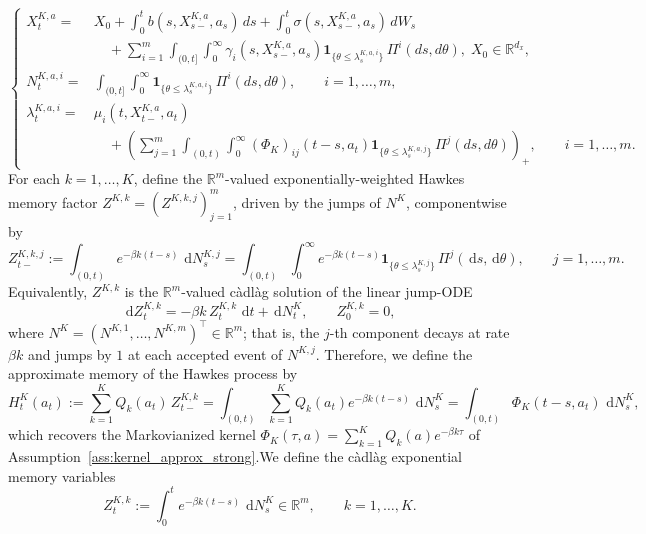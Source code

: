 \documentclass[11pt]{article}
\theoremstyle{remarkitalic}
\theoremstyle{remarkitalic}
\newcommand{\R}{\mathbb R}
\newcommand{\dd}{\,\mathrm d}
\newcommand{\1}{\mathbf 1}
\begin{document}
\begin{equation}
\label{eq:Markov-poisson-embedded-hawkes-sde}
\left\{
\begin{aligned}
X_t^{K,a}
={}&X_0
+\int_0^t b(s,X^{K,a}_{s-},a_s)\,ds
+\int_0^t \sigma(s,X^{K,a}_{s-},a_s)\,dW_s
\\
&\quad
+\sum_{i=1}^m
\int_{(0,t]}\int_0^\infty
\gamma_i(s,X^{K,a}_{s-},a_s)
\mathbf{1}_{\{\theta\leq\lambda_s^{K,a,i}\}}
\,\Pi^i(ds,d\theta),\; X_0\in \mathbb R^{d_x},
\\[0.25cm]
N_t^{K,a,i}
=&
\int_{(0,t]}\int_0^\infty
\mathbf{1}_{\{\theta\leq\lambda_s^{K,a,i}\}}
\,\Pi^i(ds,d\theta),
\qquad i=1,\ldots,m,
\\[0.25cm]
\lambda_t^{K,a,i}
={}&
\mu_i(t,X^{K,a}_{t-},a_t)
\\
&\quad
+\left(\sum_{j=1}^m
\int_{(0,t)}\int_0^\infty
(\Phi_K)_{ij}(t-s,a_t)
\mathbf{1}_{\{\theta\leq\lambda_s^{K,a,j}\}}
\,\Pi^j(ds,d\theta)\right)_+,
\qquad i=1,\ldots,m.
\end{aligned}
\right.
\end{equation} For each $k=1,\dots,K$, define the $\R^m$-valued exponentially-weighted
Hawkes memory factor $Z^{K,k}=(Z^{K,k,j})_{j=1}^m$, driven by the jumps of $N^K$, componentwise by
\[
Z_{t-}^{K,k,j}
:=
\int_{(0,t)} e^{-\beta k(t-s)}\,\dd N_s^{K,j}
=
\int_{(0,t)}\int_0^\infty
e^{-\beta k(t-s)}
\mathbf{1}_{\{\theta\leq\lambda_s^{K,j}\}}
\,\Pi^j(\dd s,\dd\theta),
\qquad j=1,\dots,m.
\]
Equivalently, $Z^{K,k}$ is the $\R^m$-valued c\`adl\`ag solution of the
linear jump-ODE 
\begin{equation}
\label{eq:memory-factor-ode}
\dd Z_t^{K,k}
=
-\beta k\,Z_t^{K,k}\,\dd t
+
\dd N_t^{K},
\qquad
Z_0^{K,k}=0,
\end{equation}
where $N^K=(N^{K,1},\dots,N^{K,m})^\top\in\R^m$; that is, the $j$-th
component decays at rate $\beta k$ and jumps by $1$ at each accepted
event of $N^{K,j}$. Therefore, we define the approximate memory of the Hawkes process by
\[
H_t^K(a_t):=\sum_{k=1}^K Q_k(a_t)\,Z_{t-}^{K,k}
=
\int_{(0,t)}\sum_{k=1}^K Q_k(a_t)e^{-\beta k(t-s)}\,\dd N_s^K
=
\int_{(0,t)}\Phi_K(t-s,a_t)\,\dd N_s^K,
\]
which recovers the Markovianized kernel
$\Phi_K(\tau,a)=\sum_{k=1}^K Q_k(a)e^{-\beta k\tau}$ of
Assumption~\ref{ass:kernel_approx_strong}.We define the c\`adl\`ag exponential memory variables
\[
    Z_t^{K,k}
    :=
    \int_0^t e^{-\beta k(t-s)}\,\dd N_s^K
    \in\R^m,
    \qquad k=1,\dots,K.
\]
\end{document}
